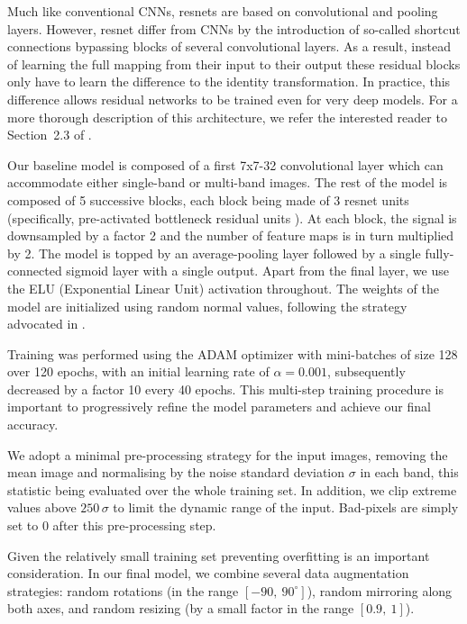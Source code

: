 \documentclass{aa}
\begin{document}
Much like conventional CNNs, resnets are based on convolutional and pooling layers. However, resnet differ from CNNs by the introduction of so-called shortcut connections bypassing blocks of several convolutional layers. As a result, instead of learning the full mapping from their input to their output these residual blocks only have to  learn the difference to the identity transformation. In practice, this difference allows residual networks to be trained even for very deep models. For a more thorough description of this architecture, we refer the interested reader to Section~2.3 of \citet{Lanusse2017}.

Our baseline model is composed of a first 7x7-32 convolutional layer which can accommodate either single-band or multi-band images. The rest of the model is composed of 5 successive blocks, each block being made of 3 resnet units (specifically, pre-activated bottleneck residual units \citep{He2016}). At each block, the signal is downsampled by a factor 2 and the number of feature maps is in turn multiplied by 2. The model is topped by an average-pooling layer followed by a single fully-connected sigmoid layer with a single output. Apart from the final layer, we use the ELU (Exponential Linear Unit) activation throughout. The weights of the model are initialized using random normal values, following the strategy advocated in \citet{He2015a}. 

Training was performed using the ADAM optimizer with mini-batches of size 128 over 120 epochs, with an initial learning rate of $\alpha=0.001$, subsequently decreased by a factor 10 every 40 epochs. This multi-step training procedure is important to progressively refine the model parameters and achieve our final accuracy.

We adopt a minimal pre-processing strategy for the input images, removing the mean image and normalising by the noise standard deviation $\sigma$ in each band, this statistic being evaluated over the whole training set. In addition, we clip extreme values above $250 \,\sigma$ to limit the dynamic range of the input. Bad-pixels are simply set to 0 after this pre-processing step.

Given the relatively small training set preventing overfitting is an important consideration. In our final model, we combine several data augmentation strategies: random rotations (in the range $[-90, \ 90^\circ]$), random mirroring along both axes, and random resizing (by a small factor in the range $[0.9, \ 1]$).
\end{document}
